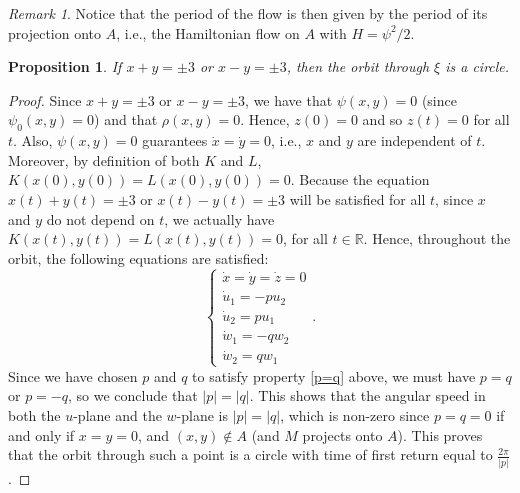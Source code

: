 \documentclass[11pt,reqno]{amsart}
\theoremstyle{plain}
\newtheorem{prop}[theorem]{Proposition}
\theoremstyle{definition}
\theoremstyle{remark}
\newtheorem{rmk}[theorem]{Remark}
\theoremstyle{plain}
\numberwithin{equation}{section}
\newcommand{\R}{\mathbb{R}}
\begin{document}
									
									\begin{rmk}\label{rmk: period is given by the flow on A}
									Notice that the period of the flow is then given by the period of its projection onto $A$, i.e., the Hamiltonian flow on $A$ with $H=\psi^{2}/2$.
									\end{rmk}	
									
									\begin{prop} \label{prop: orbitas circulos em x+y=3 pra psi}
									If $x+y=\pm 3$ or $x-y=\pm 3$, then the orbit through \(\xi\) is a circle.
									\end{prop}
									\begin{proof}
									Since $x+y=\pm 3$ or $x-y=\pm 3$, we have that $\psi(x,y)=0$ (since $\psi_{0}(x,y)=0$) and that $\rho(x,y)=0$. Hence, $z(0)=0$ and so $z(t)=0$ for all $t$. Also, $\psi(x,y)=0$ guarantees $\dot{x}=\dot{y}=0$, i.e., $x$ and $y$ are independent of $t$. Moreover, by definition of both $K$ and $L$, $K(x(0),y(0))=L(x(0),y(0))=0$. Because the equation $x(t)+y(t)=\pm 3$ or $x(t)-y(t)=\pm 3$ will be satisfied for all $t$, since $x$ and $y$ do not depend on $t$, we actually have $K(x(t),y(t))=L(x(t),y(t))=0$, for all $t\in \R$. Hence, throughout the orbit, the following equations are satisfied: $$\begin{cases}
										\dot{x}=\dot{y}=\dot{z}=0\\
										\dot{u}_{1}=-pu_{2}\\
										\dot{u}_{2}=pu_{1}\\
										\dot{w}_{1}=-qw_{2}\\
										\dot{w}_{2}=qw_{1}
									\end{cases}.$$ Since we have chosen $p$ and $q$ to satisfy property \ref{p=q} above, we must have $p=q$ or $p=-q$, so we conclude that $|p|=|q|$. This shows that the angular speed in both the $u$-plane and the $w$-plane is $|p|=|q|$, which is non-zero since $p=q=0$ if and only if $x=y=0$, and $(x,y)\notin A$ (and $M$ projects onto $A$). This proves that the orbit through such a point is a circle with time of first return equal to $\frac{2\pi}{|p|}$. 
									\end{proof}
									
\end{document}
